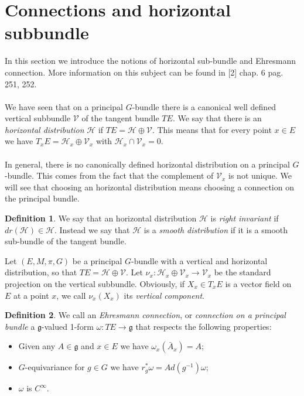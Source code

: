 \documentclass[12pt,a4paper]{report}
\theoremstyle{definition}
\newtheorem{Def}{Definition}[chapter]
\theoremstyle{Theorem}
\theoremstyle{definition}
\theoremstyle{definition}
\begin{document}
	\section{Connections and horizontal subbundle}
	In this section we introduce the notions of horizontal sub-bundle and Ehresmann connection. More information on this subject can be found in [2] chap. 6 pag. 251, 252.\\
	\\
	We have seen that on a principal $G$-bundle there is a canonical well defined vertical subbundle $\mathcal{V}$ of the tangent bundle $TE$. We say that there is an \textit{horizontal distribution} $\mathcal{H}$ if $TE=\mathcal{H}\oplus\mathcal{V}$. This means that for every point $x\in E$ we have $T_{x}E=\mathcal{H}_{x}\oplus\mathcal{V}_{x}$ with $\mathcal{H}_{x}\cap\mathcal{V}_{x}=0$.
	\\
	\\
	In general, there is no canonically defined horizontal distribution on a principal $G$-bundle. This comes from the fact that the complement of $\mathcal{V}_x$ is not unique. We will see that choosing an horizontal distribution means choosing a connection on the principal bundle. 
	\begin{Def}
		We say that an horizontal distribution $\mathcal{H}$ is \textit{right invariant} if $dr(\mathcal{H})\in \mathcal{H}$.
		Instead we say that $\mathcal{H}$ is a \textit{smooth distribution} if it is a smooth sub-bundle of the tangent bundle.
	\end{Def}
	Let $(E,M,\pi,G)$ be a principal $G$-bundle with a vertical and horizontal distribution, so that $TE=\mathcal{H}\oplus\mathcal{V}$. Let $\nu_{x}:\mathcal{H}_{x}\oplus\mathcal{V}_{x}\rightarrow \mathcal{V}_{x}$ be the standard projection on the vertical subbundle. Obviously, if $X_{x}\in T_{x}E$ is a vector field on $E$ at a point $x$, we call $\nu_{x}(X_{x})$ its \textit{vertical component}.
	\begin{Def}\label{Def_6.6}
		We call an \textit{Ehresmann connection}, or \textit{connection on a principal bundle} a $\mathfrak{g}$-valued 1-form $\omega:TE\rightarrow \mathfrak{g}$ that respects the following properties:
		\begin{itemize}
			\item Given any $A\in\mathfrak{g}$ and $x\in E$ we have $\omega_{x}(\bar{A}_{x})=A$;
			\item $G$-equivariance for $g\in G$ we have $r^*_g\omega=Ad(g^{-1})\omega$;
			\item $\omega$ is $C^\infty$.
		\end{itemize}
	\end{Def}
\end{document}
